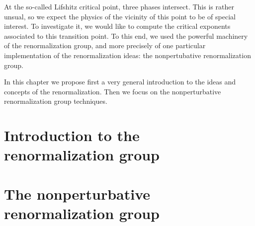 
At the so-called Lifshitz critical point, three phases intersect. This is rather unsual, so we expect the physics of the vicinity of this point to be of special interest. To investigate it, we would like to compute the critical exponents associated to this transition point. To this end, we used the powerful machinery of the renormalization group, and more precisely of one particular implementation of the renormalization ideas: the nonpertubative renormalization group.

In this chapter we propose first a very general introduction to the ideas and concepts of the renormalization. Then we focus on the nonperturbative renormalization group techniques.

\section{Introduction to the renormalization group}

\section{The nonperturbative renormalization group}
